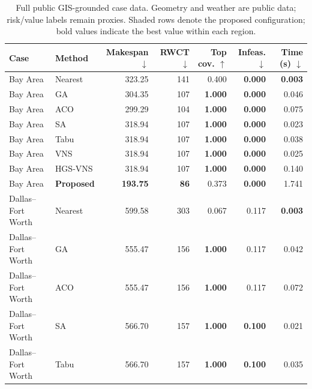 \begin{table}[H]
\centering
\caption{Full public GIS-grounded case data. Geometry and weather are public data; risk/value labels remain proxies. Shaded rows denote the proposed configuration; bold values indicate the best value within each region.}
\label{tab:gis-results}
\small
\setlength{\tabcolsep}{2.7pt}
\begin{tabular}{@{}llrrrrr@{}}
\toprule
Case & Method & Makespan $\downarrow$ & RWCT $\downarrow$ & Top cov. $\uparrow$ & Infeas. $\downarrow$ & Time (s) $\downarrow$ \\
\midrule

Bay Area & Nearest & 323.25 & 141 & 0.400 & \textbf{0.000} & \textbf{0.003} \\

Bay Area & GA & 304.35 & 107 & \textbf{1.000} & \textbf{0.000} & 0.046 \\

Bay Area & ACO & 299.29 & 104 & \textbf{1.000} & \textbf{0.000} & 0.075 \\

Bay Area & SA & 318.94 & 107 & \textbf{1.000} & \textbf{0.000} & 0.023 \\

Bay Area & Tabu & 318.94 & 107 & \textbf{1.000} & \textbf{0.000} & 0.038 \\

Bay Area & VNS & 318.94 & 107 & \textbf{1.000} & \textbf{0.000} & 0.025 \\

Bay Area & HGS-VNS & 318.94 & 107 & \textbf{1.000} & \textbf{0.000} & 0.140 \\
\rowcolor{gray!10}
Bay Area & \textbf{Proposed} & \textbf{193.75} & \textbf{86} & 0.373 & \textbf{0.000} & 1.741 \\
\addlinespace[2pt]

Dallas--Fort Worth & Nearest & 599.58 & 303 & 0.067 & 0.117 & \textbf{0.003} \\

Dallas--Fort Worth & GA & 555.47 & 156 & \textbf{1.000} & 0.117 & 0.042 \\

Dallas--Fort Worth & ACO & 555.47 & 156 & \textbf{1.000} & 0.117 & 0.072 \\

Dallas--Fort Worth & SA & 566.70 & 157 & \textbf{1.000} & \textbf{0.100} & 0.021 \\

Dallas--Fort Worth & Tabu & 566.70 & 157 & \textbf{1.000} & \textbf{0.100} & 0.035 \\


\end{tabular}
\end{table}
